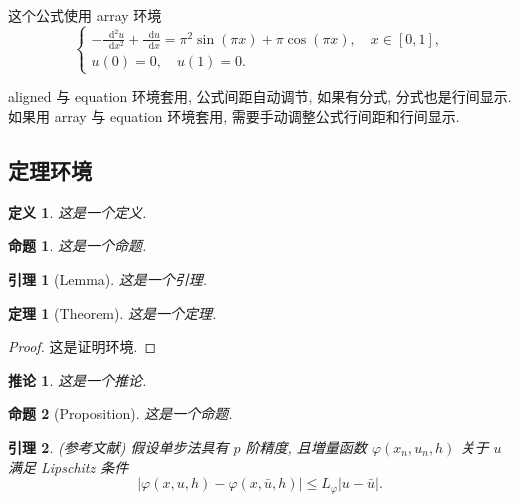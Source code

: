\documentclass[zihao=-4]{ctexart}
\numberwithin{equation}{section}
\numberwithin{figure}{section}
\numberwithin{table}{section}
\theoremstyle{plain}
\newtheorem{definition}{定义}[section]
\newtheorem{proposition}{命题}[section]
\newtheorem{lemma}{引理}[section]
\newtheorem{theorem}{定理}[section]
\newtheorem{corollary}{推论}[section]
\newcommand{\dif}{\mathop{}\!\mathrm{d}}
\begin{document}
这个公式使用 array 环境
\begin{equation}\label{eq:arrayEq}
\left\{\begin{array}{l}
\displaystyle
-\frac{{\dif}^{2} u}{\dif x^{2}}+\frac{\dif u}{\dif x}=\pi^{2} \sin (\pi x)+\pi \cos (\pi x),\quad x \in [0,1], \\[6pt]
u(0)=0,\quad u(1)=0.
\end{array} \right.
\end{equation}

aligned 与 equation 环境套用, 公式间距自动调节, 如果有分式, 分式也是行间显示. 如果用 array 与 equation 环境套用, 需要手动调整公式行间距和行间显示.


\subsection{定理环境}

\begin{definition}\label{def:foo}
这是一个定义.
\end{definition}

\begin{proposition}\label{prop:foo}
这是一个命题.
\end{proposition}

\begin{lemma}[Lemma]\label{lmm:foo}
这是一个引理.
\end{lemma}

\begin{theorem}[Theorem]\label{thm:foo}
这是一个定理.
\end{theorem}
\begin{proof}
这是证明环境.
\end{proof}

\begin{corollary}\label{cor:foo}
这是一个推论.
\end{corollary}

\begin{proposition}[Proposition]
这是一个命题.
\end{proposition}

\begin{lemma}\label{lmm:convergence} {\rm (\textit{参考文献}\cite{LiLiu1997})}
假设单步法具有 $p$ 阶精度, 且増量函数 $\varphi(x_{n}, u_{n}, h)$ 关于 $u$ 满足 \textup{Lipschitz} 条件
\begin{equation}\label{eq:conver1}
|\varphi(x, u, h)-\varphi(x, \bar{u}, h)| \leqslant L_{\varphi}|u-\bar{u}|.
\end{equation}
\end{lemma}
\end{document}
